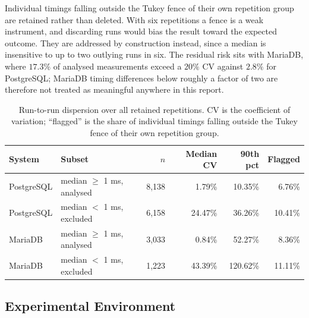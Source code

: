 \documentclass[12pt, a4paper]{article}
\begin{document}
Individual timings falling outside the Tukey fence of their own
repetition group are retained rather than deleted. With six repetitions
a fence is a weak instrument, and discarding runs would bias the result
toward the expected outcome. They are addressed by construction instead,
since a median is insensitive to up to two outlying runs in six. The
residual risk sits with MariaDB, where $17.3\%$ of analysed measurements
exceed a $20\%$ CV against $2.8\%$ for PostgreSQL; MariaDB timing
differences below roughly a factor of two are therefore not treated as
meaningful anywhere in this report.

\begin{table}[htbp]
\centering
\caption{Run-to-run dispersion over all retained repetitions. CV is the
coefficient of variation; ``flagged'' is the share of individual timings
falling outside the Tukey fence of their own repetition group.}
\label{tab:dispersion}
\small
\begin{tabular}{@{}llrrrr@{}}
\toprule
\textbf{System} & \textbf{Subset} & \textbf{$n$} & \textbf{Median CV} &
\textbf{90th pct} & \textbf{Flagged} \\
\midrule
PostgreSQL & median $\geq$ 1 ms, analysed & 8{,}138 & 1.79\% & 10.35\% & 6.76\% \\
PostgreSQL & median $<$ 1 ms, excluded & 6{,}158 & 24.47\% & 36.26\% & 10.41\% \\
MariaDB & median $\geq$ 1 ms, analysed & 3{,}033 & 0.84\% & 52.27\% & 8.36\% \\
MariaDB & median $<$ 1 ms, excluded & 1{,}223 & 43.39\% & 120.62\% & 11.11\% \\
\bottomrule
\end{tabular}
\end{table}

\subsection{Experimental Environment}
\end{document}
